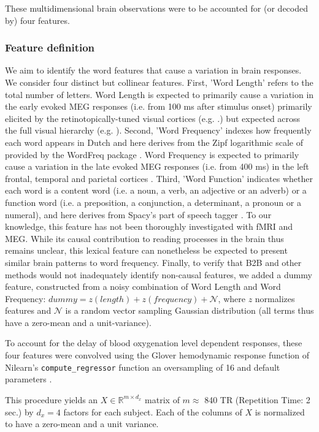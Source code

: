These multidimensional brain observations were to be accounted for (or decoded by) four features.

\subsubsection{Feature definition}

We aim to identify the word features that cause a variation in brain responses. We consider four distinct but collinear features.
%
First, 'Word Length' refers to the total number of letters. Word Length is
expected to primarily cause a variation in the early evoked MEG responses
(i.e. from 100 ms after stimulus onset) primarily elicited by the
retinotopically-tuned visual cortices (e.g. \citep{pegado2014timing}.) but
expected across the full visual hierarchy (e.g. \citep{hagler2006spatial}).
%
Second, 'Word Frequency' indexes how frequently each word appears in Dutch and
here derives from the Zipf logarithmic scale of \citep{van2014subtlex}
provided by the WordFreq package \citep{speerwordfreq}. Word Frequency is
expected to primarily cause a variation in the late evoked MEG responses (i.e.
from 400 ms) in the left frontal, temporal and parietal
cortices \citep{kutas2011thirty,mccandliss2003visual}.
%
Third, 'Word Function' indicates whether each word is a content word (i.e. a
noun, a verb, an adjective or an adverb) or a function word (i.e. a preposition,
a conjunction, a determinant, a pronoun or a numeral), and here derives from
Spacy's part of speech tagger \citep{spacy2}. To our knowledge, this feature has
not been thoroughly investigated with fMRI and MEG. While its causal contribution to
reading processes in the brain thus remains unclear, this lexical feature can
nonetheless be expected to present similar brain patterns to word frequency.
%
Finally, to verify that B2B and other methods would not inadequately identify non-causal features, we added a dummy feature, constructed from a noisy combination of Word Length and Word Frequency:
$dummy = z(length) + z(frequency) + \mathcal{N}$, where $z$ normalizes features
and $\mathcal{N}$ is a random vector sampling Gaussian distribution (all terms
thus have a zero-mean and a unit-variance).

To account for the delay of blood oxygenation level dependent responses, these four
features were convolved using the Glover hemodynamic response function
of Nilearn's \texttt{compute\_regressor} function an oversampling of 16 and default parameters \citep{Nilearn}.

This procedure yields an $X \in \mathbb{R}^{m \times d_x}$ matrix of $m\approx$
840 TR (Repetition Time: 2 sec.) by $d_x=4$ factors for each subject.
Each of the columns of $X$ is normalized to have a zero-mean and a unit variance.


